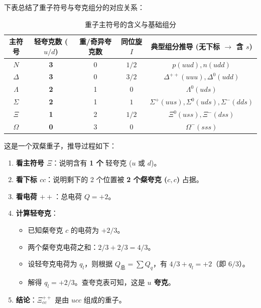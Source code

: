 下表总结了重子符号与夸克组分的对应关系：

\begin{table}[H]
    \centering
    \renewcommand{\arraystretch}{1.4}
    \small
    \begin{tabular}{|c|c|c|c|c|}
    \hline
    \textbf{主符号} & \textbf{轻夸克数 ($u/d$)} & \textbf{重/奇异夸克数} & \textbf{同位旋 $I$} & \textbf{典型组分推导 (无下标 $\to$ 含 $s$)} \\ \hline
    $N$ & \textbf{3} & 0 & $1/2$ & $p(uud), n(udd)$ \\ \hline
    $\Delta$ & \textbf{3} & 0 & $3/2$ & $\Delta^{++}(uuu), \Delta^0(udd)$ \\ \hline
    $\Lambda$ & \textbf{2} & 1 & $0$ & $\Lambda^0(uds)$ \\ \hline
    $\Sigma$ & \textbf{2} & 1 & $1$ & $\Sigma^+(uus), \Sigma^0(uds), \Sigma^-(dds)$ \\ \hline
    $\Xi$ & \textbf{1} & 2 & $1/2$ & $\Xi^0(uss), \Xi^-(dss)$ \\ \hline
    $\Omega$ & \textbf{0} & 3 & $0$ & $\Omega^-(sss)$ \\ \hline
    \end{tabular}
    \caption{重子主符号的含义与基础组分}
\end{table}

\begin{example}
    这是一个双粲重子，推导过程如下：
    \begin{enumerate}
        \item \textbf{看主符号 $\Xi$}：说明含有 \textbf{1 个} 轻夸克 ($u$ 或 $d$)。
        \item \textbf{看下标 $cc$}：说明剩下的 2 个位置被 \textbf{2 个粲夸克 ($c, c$)} 占据。
        \item \textbf{看电荷 $++$}：总电荷 $Q=+2$。
        \item \textbf{计算轻夸克}：
        \begin{itemize}
            \item 已知粲夸克 $c$ 的电荷为 $+2/3$。
            \item 两个粲夸克电荷之和：$2/3 + 2/3 = 4/3$。
            \item 设轻夸克电荷为 $q_l$，则根据 $Q_{\text{总}} = \sum Q_q$，有 $4/3 + q_l = +2$（即 $6/3$）。
            \item 解得 $q_l = +2/3$。查夸克表可知，这是 \textbf{$u$ 夸克}。
        \end{itemize}
        \item \textbf{结论}：$\Xi_{cc}^{++}$ 是由 \textbf{$ucc$} 组成的重子。
    \end{enumerate}
\end{example}



